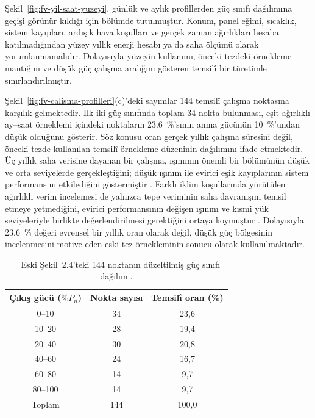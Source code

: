 Şekil~\ref{fig:fv-yil-saat-yuzeyi}, günlük ve aylık profillerden güç sınıfı dağılımına geçişi görünür kıldığı için bölümde tutulmuştur. Konum, panel eğimi, sıcaklık, sistem kayıpları, ardışık hava koşulları ve gerçek zaman ağırlıkları hesaba katılmadığından yüzey yıllık enerji hesabı ya da saha ölçümü olarak yorumlanmamalıdır. Dolayısıyla yüzeyin kullanımı, önceki tezdeki örnekleme mantığını ve düşük güç çalışma aralığını gösteren temsilî bir türetimle sınırlandırılmıştır.

Şekil~\ref{fig:fv-calisma-profilleri}(c)'deki sayımlar 144 temsilî çalışma noktasına karşılık gelmektedir. İlk iki güç sınıfında toplam 34 nokta bulunması, eşit ağırlıklı ay--saat örneklemi içindeki noktaların \SI{23.6}{\percent}'sının anma gücünün \SI{10}{\percent}'undan düşük olduğunu gösterir. Söz konusu oran gerçek yıllık çalışma süresini değil, önceki tezde kullanılan temsilî örnekleme düzeninin dağılımını ifade etmektedir. Üç yıllık saha verisine dayanan bir çalışma, ışınımın önemli bir bölümünün düşük ve orta seviyelerde gerçekleştiğini; düşük ışınım ile evirici eşik kayıplarının sistem performansını etkilediğini göstermiştir \citep{Mondol2007}. Farklı iklim koşullarında yürütülen ağırlıklı verim incelemesi de yalnızca tepe veriminin saha davranışını temsil etmeye yetmediğini, evirici performansının değişen ışınım ve kısmi yük seviyeleriyle birlikte değerlendirilmesi gerektiğini ortaya koymuştur \citep{AbRahman2020}. Dolayısıyla \SI{23.6}{\percent} değeri evrensel bir yıllık oran olarak değil, düşük güç bölgesinin incelenmesini motive eden eski tez örnekleminin sonucu olarak kullanılmaktadır.

\begin{table}[htbp]
  \centering
  \caption{\eskitezetiketi\ \juriistegietiketi\ Eski Şekil~2.4'teki 144 noktanın düzeltilmiş güç sınıfı dağılımı.}
  \label{tab:fv-guc-dagilimi}
  \begin{tabular}{ccc}
    \toprule
    \textbf{Çıkış gücü ($\%P_n$)} & \textbf{Nokta sayısı} & \textbf{Temsilî oran (\%)} \\
    \midrule
    0--10 & 34 & 23,6 \\
    10--20 & 28 & 19,4 \\
    20--40 & 30 & 20,8 \\
    40--60 & 24 & 16,7 \\
    60--80 & 14 & 9,7 \\
    80--100 & 14 & 9,7 \\
    \midrule
    Toplam & 144 & 100,0 \\
    \bottomrule
  \end{tabular}
\end{table}

